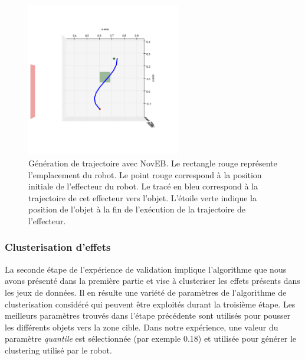 \documentclass[draft]{llncs}
\begin{document}
\begin{figure}[ht]
  \begin{center}
    \includegraphics[width=0.6\textwidth]{figures/ns_trajectory.png}
    \caption{Génération de trajectoire avec NovEB. Le rectangle rouge représente l'emplacement du robot. Le point rouge correspond à la position initiale de l'effecteur du robot. Le tracé en bleu correspond à la trajectoire de cet effecteur vers l'objet. L'étoile verte indique la position de l'objet à la fin de l'exécution de la trajectoire de l'effecteur.}
    \label{fig:ns_traj}
  \end{center}
\end{figure}




\subsubsection{Clusterisation d'effets}

La seconde étape de l'expérience de validation implique l'algorithme que nous avons présenté dans la première partie et vise à clusteriser les effets présents dans les jeux de données.
Il en résulte une variété de paramètres de l'algorithme de clusterisation considéré qui peuvent être exploités durant la troisième étape.
Les meilleurs paramètres trouvés dans l'étape précédente sont utilisés pour pousser les différents objets vers la zone cible.
Dans notre expérience, une valeur du paramètre \textit{quantile} est sélectionnée (par exemple 0.18) et utilisée pour générer le clustering utilisé par le robot.

\end{document}
